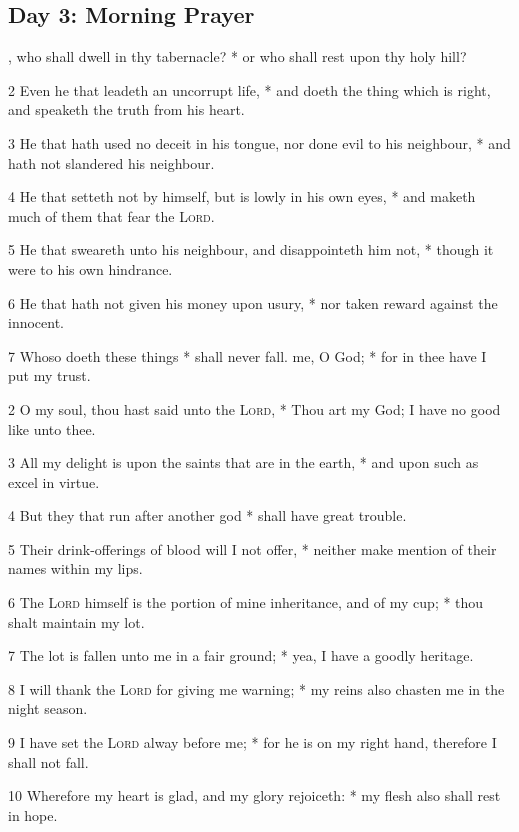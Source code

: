 \subsection{Day 3: Morning Prayer}
, who shall dwell in thy tabernacle? * or who shall rest upon thy holy hill?\par
2 Even he that leadeth an uncorrupt life, * and doeth the thing which is right, and speaketh the truth from his heart.\par
3 He that hath used no deceit in his tongue, nor done evil to his neighbour, * and hath not slandered his neighbour.\par
4 He that setteth not by himself, but is lowly in his own eyes, * and maketh much of them that fear the {\textsc{Lord}}.\par
5 He that sweareth unto his neighbour, and disappointeth him not, * though it were to his own hindrance.\par
6 He that hath not given his money upon usury, * nor taken reward against the innocent.\par
7 Whoso doeth these things * shall never fall.
 me, O God; * for in thee have I put my trust.\par
2 O my soul, thou hast said unto the {\textsc{Lord}}, * Thou art my God; I have no good like unto thee.\par
3 All my delight is upon the saints that are in the earth, * and upon such as excel in virtue.\par
4 But they that run after another god * shall have great trouble.\par
5 Their drink-offerings of blood will I not offer, * neither make mention of their names within my lips.\par
6 The {\textsc{Lord}} himself is the portion of mine inheritance, and of my cup; * thou shalt maintain my lot.\par
7 The lot is fallen unto me in a fair ground; * yea, I have a goodly heritage.\par
8 I will thank the {\textsc{Lord}} for giving me warning; * my reins also chasten me in the night season.\par
9 I have set the {\textsc{Lord}} alway before me; * for he is on my right hand, therefore I shall not fall.\par
10 Wherefore my heart is glad, and my glory rejoiceth: * my flesh also shall rest in hope.\par
